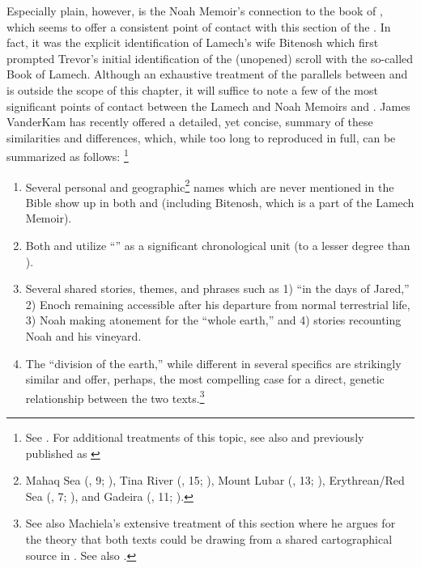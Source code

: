 Especially plain, however, is the Noah Memoir's connection to the book of \jub, which seems to offer a consistent point of contact with this section of the \ga.\autocite[20]{fitzmyer2004} In fact, it was the explicit identification of Lamech's wife Bitenosh which first prompted Trevor's initial identification of the (unopened) scroll with the so-called Book of Lamech.\autocite{trevor_basor1949} Although an exhaustive treatment of the parallels between \jub and \ga is outside the scope of this chapter, it will suffice to note a few of the most significant points of contact between the Lamech and Noah Memoirs and \jub. James VanderKam has recently offered a detailed, yet concise, summary of these similarities and differences, which, while too long to reproduced in full, can be summarized as follows:%
\footnote{See \cite[374--376]{vanderkam_feldman-etal2017}. For additional treatments of this topic, see also \cite{machiela2009} and \cite[305--342]{kugel2012} previously published as \cite{kugel_roitman-etal2011}} 

\begin{enumerate}
    \item Several personal and geographic\footnote{%
        Mahaq Sea (, 9; ), Tina River (, 15; ), Mount Lubar (, 13; ), Erythrean/Red Sea (, 7; ), and Gadeira (, 11; ).}%
        names which are never mentioned in the Bible show up in both \ga and \jub (including Bitenosh, which is a part of the Lamech Memoir).
    \item Both \jub and \ga utilize ``\jub'' as a significant chronological unit (\ga to a lesser degree than \jub).
    \item Several shared stories, themes, and phrases such as 1) ``in the days of Jared,'' 2) Enoch remaining accessible after his departure from normal terrestrial life, 3) Noah making atonement for the ``whole earth,'' and 4) stories recounting Noah and his vineyard.
    \item The ``division of the earth,'' while different in several specifics are strikingly similar and offer, perhaps, the most compelling case for a direct, genetic relationship between the two texts.\footnote{See also Machiela's extensive treatment of this section where he argues for the theory that both texts could be drawing from a shared cartographical source in \cite*[105--130]{machiela2009}. See also \cite{alexander_jjs1982}.}
\end{enumerate}


